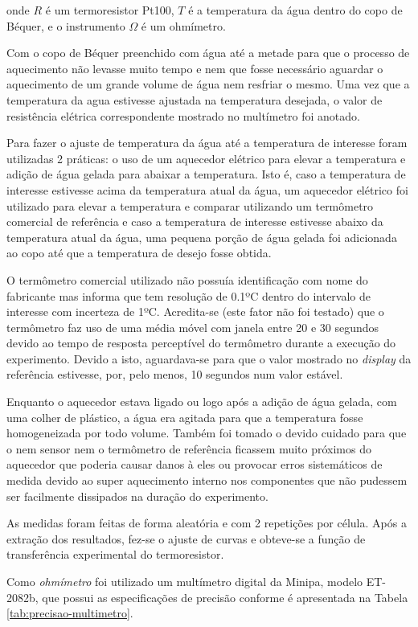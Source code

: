 \documentclass[a4paper]{instrumentacao}
\begin{document}
\noindent
onde $R$ é um termoresistor Pt100, $T$ é a temperatura da água dentro do copo de Béquer, e o instrumento $\Omega$ é um ohmímetro.

Com o copo de Béquer preenchido com água até a metade para que o processo de aquecimento não levasse muito tempo e nem que fosse necessário aguardar o aquecimento de um grande volume de água nem resfriar o mesmo. Uma vez que a temperatura da agua estivesse ajustada na temperatura desejada, o valor de resistência elétrica correspondente mostrado no multímetro foi anotado.

Para fazer o ajuste de temperatura da água até a temperatura de interesse foram utilizadas 2 práticas: o uso de um aquecedor elétrico para elevar a temperatura e adição de água gelada para abaixar a temperatura. Isto é, caso a temperatura de interesse estivesse acima da temperatura atual da água, um aquecedor elétrico foi utilizado para elevar a temperatura e comparar utilizando um termômetro comercial de referência e caso a temperatura de interesse estivesse abaixo da temperatura atual da água, uma pequena porção de água gelada foi adicionada ao copo até que a temperatura de desejo fosse obtida.

O termômetro comercial utilizado não possuía identificação com nome do fabricante mas informa que tem resolução de 0.1ºC dentro do intervalo de interesse com incerteza de 1ºC. Acredita-se (este fator não foi testado) que o termômetro faz uso de uma média móvel com janela entre 20 e 30 segundos devido ao tempo de resposta perceptível do termômetro durante a execução do experimento. Devido a isto, aguardava-se para que o valor mostrado no \textit{display} da referência estivesse, por, pelo menos, 10 segundos num valor estável.

Enquanto o aquecedor estava ligado ou logo após a adição de água gelada, com uma colher de plástico, a água era agitada para que a temperatura fosse homogeneizada por todo volume. Também foi tomado o devido cuidado para que o nem sensor nem o termômetro de referência ficassem muito próximos do aquecedor que poderia causar danos à eles ou provocar erros sistemáticos de medida devido ao super aquecimento interno nos componentes que não pudessem ser facilmente dissipados na duração do experimento.

As medidas foram feitas de forma aleatória e com 2 repetições por célula. Após a extração dos resultados, fez-se o ajuste de curvas e obteve-se a função de transferência experimental do termoresistor.

Como \textit{ohmímetro} foi utilizado um multímetro digital da Minipa, modelo ET-2082b, que possui as especificações de precisão conforme é apresentada na Tabela \ref{tab:precisao-multimetro}. 
\end{document}
